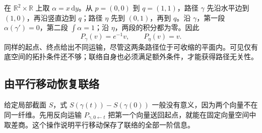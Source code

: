 \begin{example}\label{g1:exm:path-dependent-line-transport}
	在 \(\mathbb R^2\times\mathbb R\) 上取 \(\alpha=x\,\mathrm{d}y\)。从 \(p=(0,0)\) 到 \(q=(1,1)\)，路径 \(\gamma\) 先沿水平边到 \((1,0)\)，再沿竖直边到 \(q\)；路径 \(\eta\) 先到 \((0,1)\)，再到 \(q\)。沿 \(\gamma\)，第一段 \(\alpha(\gamma')=0\)，第二段 \(\int\alpha=1\)；沿 \(\eta\)，两段的积分都为零。因此
	\[
		P_\gamma(v)=e^{-1}v,\qquad P_\eta(v)=v.
	\]
	同样的起点、终点给出不同运输，尽管这两条路径位于可收缩的平面内。可见仅有底空间的拓扑条件还不够；联络自身也必须满足额外条件，才能获得路径无关性。
	
\end{example}

\subsection{由平行移动恢复联络}
\label{g1:subsec:1502:03}

给定局部截面 \(S\)，式 \(S(\gamma(t))-S(\gamma(0))\) 一般没有意义，因为两个向量不在同一纤维。先用反向运输 \(P_{\gamma,0\leftarrow t}\) 把第一个向量送回起点，就能在固定向量空间中取差商。这个操作说明平行移动保存了联络的全部一阶信息。

